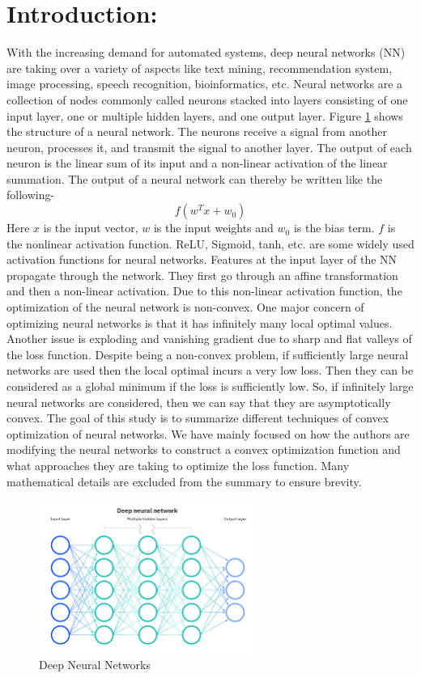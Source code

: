 \documentclass{article}
\begin{document}
\section{Introduction:}
With the increasing demand for automated systems, deep neural networks (NN) are taking over a variety of aspects like text mining, recommendation system, image processing, speech recognition, bioinformatics, etc. Neural networks are a collection of nodes commonly called neurons stacked into layers consisting of one input layer, one or multiple hidden layers, and one output layer. Figure \ref{fig:my_label} shows the structure of a neural network. The neurons receive a signal from another neuron, processes it, and transmit the signal to another layer. The output of each neuron is the linear sum of its input and a non-linear activation of the linear summation. The output of a neural network can thereby be written like the following-
\begin{equation}
    f(w^Tx + w_0)
\end{equation}
Here $x$ is the input vector, $w$ is the input weights and $w_0$ is the bias term. $f$ is the nonlinear activation function. ReLU, Sigmoid, tanh, etc. are some widely used activation functions for neural networks. Features at the input layer of the NN propagate through the network. They first go through an affine transformation and then a non-linear activation. Due to this non-linear activation function, the optimization of the neural network is non-convex. One major concern of optimizing neural networks is that it has infinitely many local optimal values. Another issue is exploding and vanishing gradient due to sharp and flat valleys of the loss function. Despite being a non-convex problem, if sufficiently large neural networks are used then the local optimal incurs a very low loss. Then they can be considered as a global minimum if the loss is sufficiently low. So, if infinitely large neural networks are considered, then we can say that they are asymptotically convex. The goal of this study is to summarize different techniques of convex optimization of neural networks. We have mainly focused on how the authors are modifying the neural networks to construct a convex optimization function and what approaches they are taking to optimize the loss function. Many mathematical details are excluded from the summary to ensure brevity. 

\begin{figure}[h]
    \centering
    \includegraphics[width =7cm]{ProjectSubmissionFiles/download.png}
    \caption{Deep Neural Networks}
    \label{fig:my_label}
\end{figure}
\end{document}
